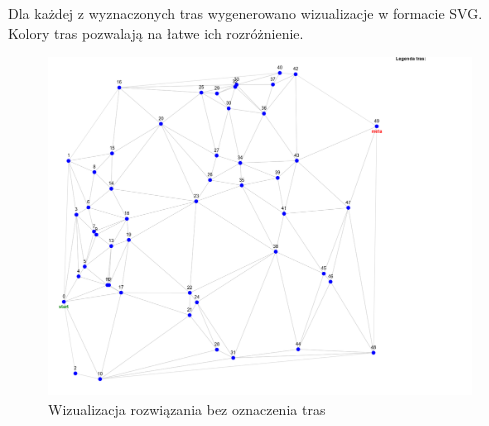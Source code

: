 \documentclass{article}
\begin{document}
Dla każdej z wyznaczonych tras wygenerowano wizualizacje w formacie SVG. Kolory tras pozwalają na łatwe ich rozróżnienie.

\begin{figure}[H]
    \centering
    \includegraphics[width=1\linewidth]{375D41B5-CECC-49F4-95EB-B779CC90831A.png}
    \caption{Wizualizacja rozwiązania bez oznaczenia tras}
    \label{fig:enter-label}
\end{figure}
\end{document}
